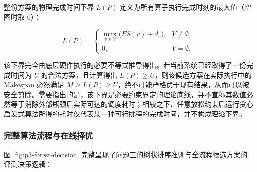 \documentclass[anonymous,withtoc]{gmcm2026}
\begin{document}
整份方案的物理完成时间下界 \(L(P)\) 定义为所有算子执行完成时刻的最大值（空图时取 0）：

\begin{equation}
L(P) = \begin{cases} \displaystyle \max_{v \in V} \bigl( ES(v) + d_v \bigr), & V \ne \emptyset, \\ 0, & V = \emptyset. \end{cases}
\end{equation}

该下界完全由底层硬件执行的必要不等式推导得出。若当前系统已经取得了一份完成时间为 \(U\) 的合法方案，且计算得出 \(L(P) \ge U\)，则该候选方案在实际执行中的 Makespan 必然满足 \(M \ge L(P) \ge U\)，绝不可能严格优于现有结果，从而可以被安全剪除。需要指出的是，该下界是必要约束界定的理论底线，并不宣称其数值必然等于消除外部瓶颈后实际可达的调度耗时；相较之下，任意放松约束后运行贪心启发式算法所得的耗时仅代表某一种可行排程的完成时间，并不构成理论下界。

\subsubsection{完整算法流程与在线择优}

图 \ref{fig:p3-forest-decision} 完整呈现了问题三的树状排序准则与全流程候选方案的评测决策逻辑：
\end{document}
